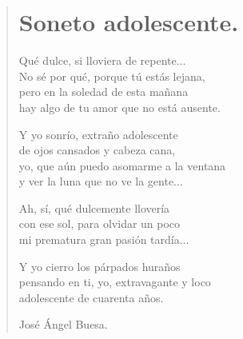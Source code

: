\documentclass[11pt, portrait, twoside, notitlepage, openright]{book}
\begin{document}
\newpage
\begin{verse}
\begin{center}
\section{Soneto adolescente.}
\end{center}
Qué dulce, si lloviera de repente...\\
No sé por qué, porque tú estás lejana,\\
pero en la soledad de esta mañana\\
hay algo de tu amor que no está ausente.
\newline

Y yo sonrío, extraño adolescente\\
de ojos cansados y cabeza cana,\\
yo, que aún puedo asomarme a la ventana\\
y ver la luna que no ve la gente...
\newline

Ah, sí, qué dulcemente llovería\\
con ese sol, para olvidar un poco\\
mi prematura gran pasión tardía...
\newline

Y yo cierro los párpados huraños\\
pensando en ti, yo, extravagante y loco\\
adolescente de cuarenta años.
\newline

José Ángel Buesa.
\end{verse}
\end{document}
